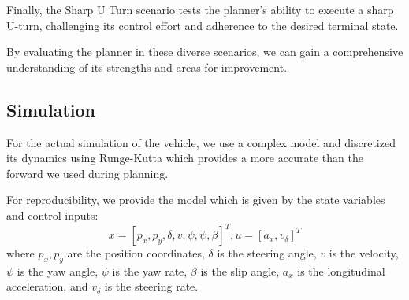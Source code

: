 Finally, the Sharp U Turn scenario tests the planner's ability to execute a sharp U-turn, challenging its control effort and adherence to the desired
terminal state.

By evaluating the planner in these diverse scenarios, we can gain a comprehensive understanding of its strengths and areas for improvement.

\subsection{Simulation} \label{subsec:simulation}

For the actual simulation of the vehicle, we use a complex model and discretized its dynamics using Runge-Kutta which provides a more accurate than
the forward we used during planning.

For reproducibility, we provide the model which is given by the state variables and control inputs: \[ x = [p_x, p_y, \delta, v, \psi, \dot{\psi},
	\beta]^T, u = [a_x, v_{\delta}]^T \] where $p_x, p_y$ are the position coordinates, $\delta$ is the steering angle, $v$ is the velocity, $\psi$ is
the yaw angle, $\dot{\psi}$ is the yaw rate, $\beta$ is the slip angle, $a_x$ is the longitudinal acceleration, and $v_{\delta}$ is the steering
rate.

